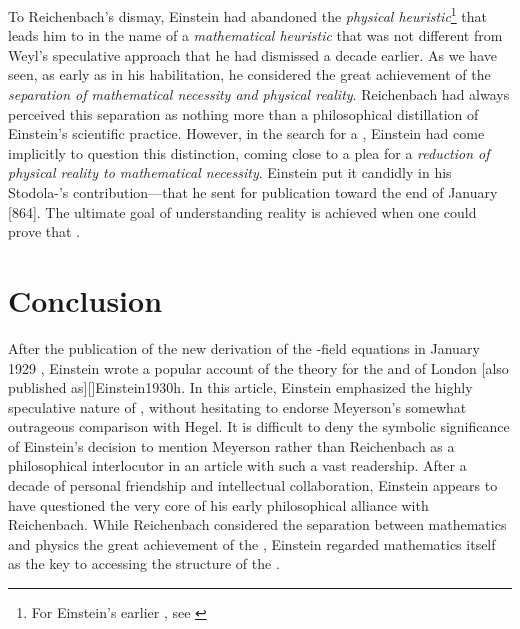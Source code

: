 \documentclass[final]{article}
\newcommand{\FP}{\german{Fernparallelismus}\xspace}
\begin{document}
To Reichenbach's dismay, Einstein had abandoned the \emph{physical heuristic}\footnote{For Einstein's earlier , see \cite{Giovanelli2020a}} that leads him to \gr in the name of a \emph{mathematical heuristic} that was not different from Weyl's speculative approach that he had dismissed a decade earlier. As we have seen, as early as in his habilitation, he considered the great achievement of \rt the \emph{separation of mathematical necessity and physical reality}. Reichenbach had always perceived this separation as nothing more than a philosophical distillation of Einstein's scientific practice. However, in the search for a \uft, Einstein had come implicitly to question this distinction, coming close to a plea for a \emph{reduction of physical reality to mathematical necessity}. Einstein put it candidly in his Stodola-'s contribution---that he sent for publication toward the end of January [864]. The ultimate goal of understanding reality is achieved when one could prove that  \citep[127]{Einstein1929}.

\section{Conclusion}
%
After the publication of the new derivation of the \FP-field equations in January 1929 \citep{Einstein1929b}, Einstein wrote a popular account of the theory for the  and  of London [also published as][]{Einstein1930h}. In this article, Einstein emphasized the highly speculative nature of \uftp, without hesitating to endorse Meyerson's somewhat outrageous comparison with Hegel. It is difficult to deny the symbolic significance of Einstein's decision to mention Meyerson rather than Reichenbach as a philosophical interlocutor in an article with such a vast readership. After a decade of personal friendship and intellectual collaboration, Einstein appears to have questioned the very core of his early philosophical alliance with Reichenbach. While Reichenbach considered the separation between mathematics and physics the great achievement of the \rt, Einstein regarded mathematics itself as the key to accessing the structure of the .
\end{document}
